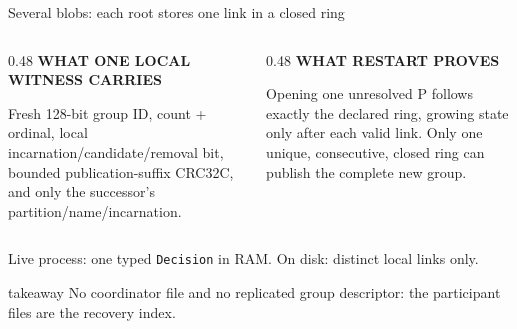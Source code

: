\documentclass[aspectratio=169,10pt]{beamer}
\newcommand{\eyebrow}[1]{\textcolor{Accent}{\bfseries\scriptsize\MakeUppercase{#1}}}
\newcommand{\takeaway}[1]{%
  \begin{beamercolorbox}[wd=\dimexpr\textwidth-0.36cm\relax,sep=0.18cm,leftskip=0.08cm,rightskip=0.08cm]{takeaway}%
    \color{Ink}\small #1
  \end{beamercolorbox}%
}
\begin{document}
\begin{frame}[t]{Several blobs: each root stores one link in a closed ring}
  \vspace{0.2cm}
  \begin{columns}[T,onlytextwidth]
    \begin{column}{0.48\textwidth}
      \eyebrow{What one local witness carries}\par\smallskip
      \scriptsize Fresh 128-bit group ID, count + ordinal, local incarnation/candidate/removal bit, bounded publication-suffix CRC32C, and only the successor's partition/name/incarnation.
    \end{column}
    \begin{column}{0.48\textwidth}
      \eyebrow{What restart proves}\par\smallskip
      \scriptsize Opening one unresolved P follows exactly the declared ring, growing state only after each valid link. Only one unique, consecutive, closed ring can publish the complete new group.
    \end{column}
  \end{columns}

  \vspace{0.12cm}
  \centering\scriptsize Live process: one typed \texttt{Decision} in RAM. On disk: distinct local links only.

  \vfill
  \takeaway{No coordinator file and no replicated group descriptor: the participant files are the recovery index.}

\end{frame}
\end{document}
